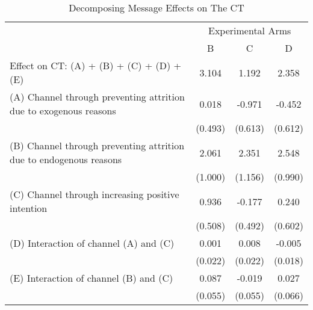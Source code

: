 \documentclass[12pt, a4paper]{article}
\begin{document}
\begin{table}[H]

\caption{\label{tab:decompose-ct}Decomposing Message Effects on The CT}
\centering
\fontsize{8}{10}\selectfont
\begin{threeparttable}
\begin{tabular}[t]{lccc}
\toprule
\multicolumn{1}{c}{ } & \multicolumn{3}{c}{Experimental Arms} \\
\cmidrule(l{3pt}r{3pt}){2-4}
 & B & C & D\\
\midrule
Effect on CT: (A) + (B) + (C) + (D) + (E) & 3.104 & 1.192 & 2.358\\
(A) Channel through preventing attrition due to exogenous reasons & 0.018 & -0.971 & -0.452\\
 & (0.493) & (0.613) & (0.612)\\
(B) Channel through preventing attrition due to endogenous reasons & 2.061 & 2.351 & 2.548\\
 & (1.000) & (1.156) & (0.990)\\
(C) Channel through increasing positive intention & 0.936 & -0.177 & 0.240\\
 & (0.508) & (0.492) & (0.602)\\
(D) Interaction of channel (A) and (C) & 0.001 & 0.008 & -0.005\\
 & (0.022) & (0.022) & (0.018)\\
(E) Interaction of channel (B) and (C) & 0.087 & -0.019 & 0.027\\
 & (0.055) & (0.055) & (0.066)\\
\bottomrule
\end{tabular}
\begin{tablenotes}
\item 
\end{tablenotes}
\end{threeparttable}
\end{table}
\end{document}

